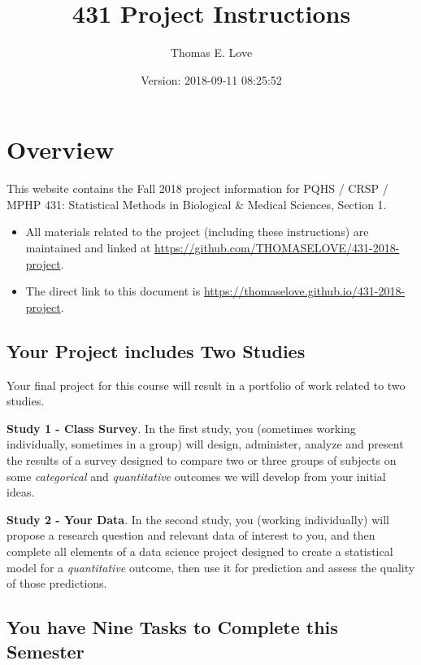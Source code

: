 \documentclass[]{book}
\title{431 Project Instructions}
\author{Thomas E. Love}
\date{Version: 2018-09-11 08:25:52}
\providecommand{\tightlist}{%
  \setlength{\itemsep}{0pt}\setlength{\parskip}{0pt}}
\theoremstyle{definition}
\theoremstyle{definition}
\theoremstyle{definition}
\theoremstyle{remark}
\begin{document}
\maketitle

{
\setcounter{tocdepth}{1}
\tableofcontents
}
\hypertarget{overview}{%
\chapter*{Overview}\label{overview}}

This website contains the Fall 2018 project information for PQHS / CRSP
/ MPHP 431: Statistical Methods in Biological \& Medical Sciences,
Section 1.

\begin{itemize}
\tightlist
\item
  All materials related to the project (including these instructions)
  are maintained and linked at
  \url{https://github.com/THOMASELOVE/431-2018-project}.
\item
  The direct link to this document is
  \url{https://thomaselove.github.io/431-2018-project}.
\end{itemize}

\hypertarget{your-project-includes-two-studies}{%
\section*{Your Project includes Two
Studies}\label{your-project-includes-two-studies}}

Your final project for this course will result in a portfolio of work
related to two studies.

\textbf{Study 1 - Class Survey}. In the first study, you (sometimes
working individually, sometimes in a group) will design, administer,
analyze and present the results of a survey designed to compare two or
three groups of subjects on some \emph{categorical} and
\emph{quantitative} outcomes we will develop from your initial ideas.

\textbf{Study 2 - Your Data}. In the second study, you (working
individually) will propose a research question and relevant data of
interest to you, and then complete all elements of a data science
project designed to create a statistical model for a \emph{quantitative}
outcome, then use it for prediction and assess the quality of those
predictions.

\hypertarget{you-have-nine-tasks-to-complete-this-semester}{%
\section*{You have Nine Tasks to Complete this
Semester}\label{you-have-nine-tasks-to-complete-this-semester}}
\end{document}
